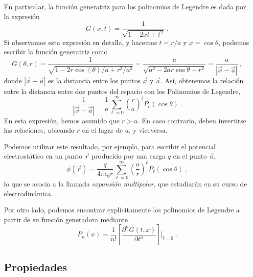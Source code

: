 En particular, la función generatriz para los polinomios de Legendre es dada por la expresión
\begin{equation}
    G(x,t) = \frac{1}{\sqrt{1-2xt + t^2}} \ .
\end{equation}
Si observamos esta expresión en detalle, y hacemos $t=r/a$ y $x = \cos\theta$, podemos escribir la función generatriz como
\begin{equation}
    G(\theta, r) = \frac{1}{\sqrt{1-2r \cos(\theta)/a + r^2/a^2}} = \frac{a}{\sqrt{a^2-2ar\cos\theta + r^2}} = \frac{a}{|\vec{x}-\vec{a}|} \ , 
\end{equation} 
donde $|\vec{x}-\vec{a}|$ es la distancia entre los puntos $\vec{x}$ y $\vec{a}$. Así, obtenemos la relación entre la distancia entre dos puntos del espacio con los Polinomios de Legendre,
\begin{equation}
    \frac{1}{|\vec{x} - \vec{a}|} = \frac{1}{a}\sum_{\ell=0}^\infty \left( \frac{r}{a} \right)^\ell P_\ell(\cos\theta) \ .
\end{equation} 
En esta expresión, hemos asumido que $r>a$. En caso contrario, deben invertirse las relaciones, ubicando $r$ en el lugar de $a$, y viceversa.

Podemos utilizar este resultado, por ejemplo, para escribir el potencial electrostático en un punto $\vec{r}$ producido por una carga $q$ en el punto $\vec{a}$,
\begin{equation}
    \phi(\vec{r}) = \frac{q}{4\pi \epsilon_0 r} \sum_{\ell=0}^\infty \left( \frac{a}{r} \right)^\ell P_\ell(\cos\theta) \ ,
\end{equation}
lo que se asocia a la llamada \emph{expansión multipolar}, que estudiarán en su curso de electrodinámica.

Por otro lado, podemos encontrar explícitamente los polinomios de Legendre a partir de su función generadora mediante
\begin{equation}
    P_n(x) = \frac{1}{n!} \left[ \frac{\partial ^n G(t,x)}{\partial t^n} \right] \left. \right|_{t=0} \ .
\end{equation}

\subsection{Propiedades}

